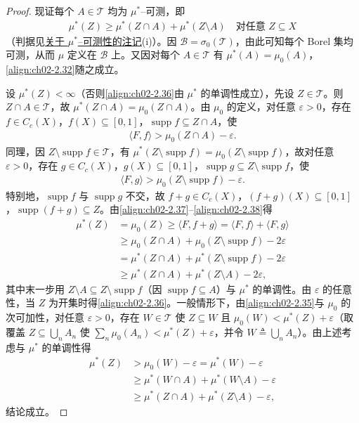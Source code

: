 \documentclass[../../main.tex]{subfiles}%
\begin{document}
\begin{proof}
现证每个 $A\in\mathscr T$ 均为 $\mu^*$--可测，即
\begin{align}
\mu^*(Z)\geqslant\mu^*(Z\cap A)+\mu^*(Z\setminus A)\quad\text{对任意 }Z\subseteq X \label{align:ch02-2.36}
\end{align}
（判据见\hyperref[remark:ch01-外测度可测]{关于 $\mu^*$--可测性的注记}(i)）。因 $\mathscr B=\sigma_0(\mathscr T)$，由此可知每个 Borel 集均可测，从而 $\mu$ 定义在 $\mathscr B$ 上。又因对每个 $A\in\mathscr T$ 有 $\mu^*(A)=\mu_0(A)$，\eqref{align:ch02-2.32}随之成立。

设 $\mu^*(Z)<\infty$（否则\eqref{align:ch02-2.36}由 $\mu^*$ 的单调性成立），先设 $Z\in\mathscr T$。则 $Z\cap A\in\mathscr T$，故 $\mu^*(Z\cap A)=\mu_0(Z\cap A)$。由 $\mu_0$ 的定义，对任意 $\varepsilon>0$，存在 $f\in C_c(X)$，$f(X)\subseteq[0,1]$，$\operatorname{supp}f\subseteq Z\cap A$，使
\begin{align}
\langle F,f\rangle>\mu_0(Z\cap A)-\varepsilon. \label{align:ch02-2.37}
\end{align}
同理，因 $Z\setminus\operatorname{supp}f\in\mathscr T$，有 $\mu^*(Z\setminus\operatorname{supp}f)=\mu_0(Z\setminus\operatorname{supp}f)$，故对任意 $\varepsilon>0$，存在 $g\in C_c(X)$，$g(X)\subseteq[0,1]$，$\operatorname{supp}g\subseteq Z\setminus\operatorname{supp}f$，使
\begin{align}
\langle F,g\rangle>\mu_0(Z\setminus\operatorname{supp}f)-\varepsilon. \label{align:ch02-2.38}
\end{align}
特别地，$\operatorname{supp}f$ 与 $\operatorname{supp}g$ 不交，故 $f+g\in C_c(X)$，$(f+g)(X)\subseteq[0,1]$，$\operatorname{supp}(f+g)\subseteq Z$。由\eqref{align:ch02-2.37}--\eqref{align:ch02-2.38}得
\begin{align*}
\mu^*(Z)&=\mu_0(Z)\geqslant\langle F,f+g\rangle=\langle F,f\rangle+\langle F,g\rangle\\
&\geqslant\mu_0(Z\cap A)+\mu_0(Z\setminus\operatorname{supp}f)-2\varepsilon\\
&=\mu^*(Z\cap A)+\mu^*(Z\setminus\operatorname{supp}f)-2\varepsilon\\
&\geqslant\mu^*(Z\cap A)+\mu^*(Z\setminus A)-2\varepsilon,
\end{align*}
其中末一步用 $Z\setminus A\subseteq Z\setminus\operatorname{supp}f$（因 $\operatorname{supp}f\subseteq A$）与 $\mu^*$ 的单调性。由 $\varepsilon$ 的任意性，当 $Z$ 为开集时得\eqref{align:ch02-2.36}。一般情形下，由\eqref{align:ch02-2.35}与 $\mu_0$ 的次可加性，对任意 $\varepsilon>0$，存在 $W\in\mathscr T$ 使 $Z\subseteq W$ 且 $\mu_0(W)<\mu^*(Z)+\varepsilon$（取覆盖 $Z\subseteq\bigcup_nA_n$ 使 $\sum_n\mu_0(A_n)<\mu^*(Z)+\varepsilon$，并令 $W\triangleq\bigcup_nA_n$）。由上述考虑与 $\mu^*$ 的单调性得
\begin{align*}
\mu^*(Z)&>\mu_0(W)-\varepsilon=\mu^*(W)-\varepsilon\\
&\geqslant\mu^*(W\cap A)+\mu^*(W\setminus A)-\varepsilon\\
&\geqslant\mu^*(Z\cap A)+\mu^*(Z\setminus A)-\varepsilon,
\end{align*}
结论成立。


\end{proof}
\end{document}
